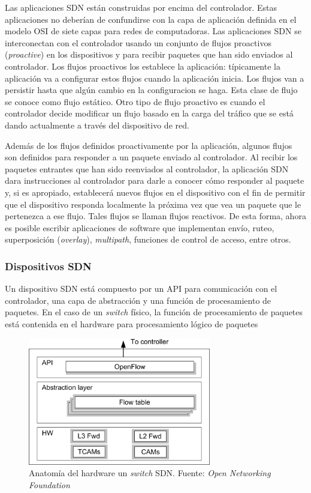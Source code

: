 \documentclass[10pt,journal,compsoc]{IEEEtran}
\begin{document}
Las aplicaciones SDN están construidas por encima del controlador. Estas aplicaciones no deberían de confundirse con la capa de aplicación definida en el modelo OSI de siete capas para redes de computadoras. Las aplicaciones SDN se interconectan con el controlador usando un conjunto de flujos proactivos (\emph{proactive}) en los dispositivos y para recibir paquetes que han sido enviados al controlador. Los flujos proactivos los establece la aplicación: típicamente la aplicación va a configurar estos flujos cuando la aplicación inicia. Los flujos van a persistir hasta que algún cambio en la configuracion se haga. Esta clase de flujo se conoce como flujo estático. Otro tipo de flujo proactivo es cuando el controlador decide modificar un flujo basado en la carga del tráfico que se está dando actualmente a través del dispositivo de red.

Además de los flujos definidos proactivamente por la aplicación, algunos flujos son definidos para responder a un paquete enviado al controlador. Al recibir los paquetes entrantes que han sido reenviados al controlador, la aplicación SDN dara instrucciones al controlador para darle a conocer cómo responder al paquete y, si es apropiado, establecerá nuevos flujos en el dispositivo con el fin de permitir que el dispositivo responda localmente la próxima vez que vea un paquete que le pertenezca a ese flujo. Tales flujos se llaman flujos reactivos. De esta forma, ahora es posible escribir aplicaciones de software que implementan envío, ruteo, superposición (\emph{overlay}), \emph{multipath}, funciones de control de acceso, entre otros.

\subsubsection{Dispositivos SDN}
Un dispositivo SDN está compuesto por un API para comunicación con el controlador, una capa de abstracción y una función de procesamiento de paquetes. En el caso de un \emph{switch} físico, la función de procesamiento de paquetes está contenida en el hardware para procesamiento lógico de paquetes 

\begin{figure}[h]
    \centering
    \includegraphics[width=8cm]{physical-switch}
    \caption{Anatomía del hardware un \emph{switch} SDN. Fuente: \emph{Open Networking Foundation}}
    \label{fig:sdn-arquitectura}
\end{figure}
\end{document}
